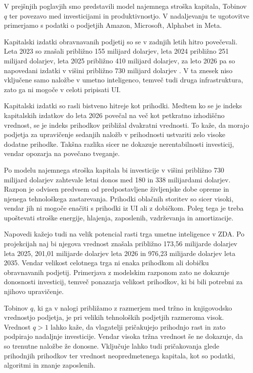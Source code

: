 \documentclass[12pt,a4paper]{article}
\begin{document}
V prejšnjih poglavjih smo predstavili model najemnega stroška kapitala, Tobinov $q$ ter povezavo med investicijami in produktivnostjo. V nadaljevanju te ugotovitve primerjamo s podatki o podjetjih Amazon, Microsoft, Alphabet in Meta.

Kapitalski izdatki obravnavanih podjetij so se v zadnjih letih hitro povečevali. Leta 2023 so znašali približno 155 milijard dolarjev, leta 2024 približno 251 milijard dolarjev, leta 2025 približno 410 milijard dolarjev, za leto 2026 pa so napovedani izdatki v višini približno 730 milijard dolarjev \citep{ValueAddVC,Forbes2026,Platformonomics2025,Platformonomics2026}. V ta znesek niso vključene samo naložbe v umetno inteligenco, temveč tudi druga infrastruktura, zato ga ni mogoče v celoti pripisati UI.

Kapitalski izdatki so rasli bistveno hitreje kot prihodki. Medtem ko se je indeks kapitalskih izdatkov do leta 2026 povečal na več kot petkratno izhodiščno vrednost, se je indeks prihodkov približal dvakratni vrednosti. To kaže, da morajo podjetja za upravičenje sedanjih naložb v prihodnosti ustvariti zelo visoke dodatne prihodke. Takšna razlika sicer ne dokazuje nerentabilnosti investicij, vendar opozarja na povečano tveganje.

Po modelu najemnega stroška kapitala bi investicije v višini približno 730 milijard dolarjev zahtevale letni donos med 180 in 338 milijardami dolarjev. Razpon je odvisen predvsem od predpostavljene življenjske dobe opreme in njenega tehnološkega zastarevanja. Prihodki oblačnih storitev so sicer visoki, vendar jih ni mogoče enačiti s prihodki iz UI ali z dobičkom. Poleg tega je treba upoštevati stroške energije, hlajenja, zaposlenih, vzdrževanja in amortizacije.

Napovedi kažejo tudi na velik potencial rasti trga umetne inteligence v ZDA. Po projekcijah naj bi njegova vrednost znašala približno 173,56 milijarde dolarjev leta 2025, 201,01 milijarde dolarjev leta 2026 in 976,23 milijarde dolarjev leta 2035. Vendar velikost celotnega trga ni enaka prihodkom ali dobičku obravnavanih podjetij. Primerjava z modelskim razponom zato ne dokazuje donosnosti investicij, temveč ponazarja velikost prihodkov, ki bi bili potrebni za njihovo upravičenje.

Tobinov $q$, ki ga v nalogi približamo z razmerjem med tržno in knjigovodsko vrednostjo podjetja, je pri velikih tehnoloških podjetjih razmeroma visok. Vrednost $q > 1$ lahko kaže, da vlagatelji pričakujejo prihodnjo rast in zato podpirajo nadaljnje investicije. Vendar visoka tržna vrednost še ne dokazuje, da so trenutne naložbe že donosne. Vključuje lahko tudi pričakovanja glede prihodnjih prihodkov ter vrednost neopredmetenega kapitala, kot so podatki, algoritmi in znanje zaposlenih.
\end{document}
